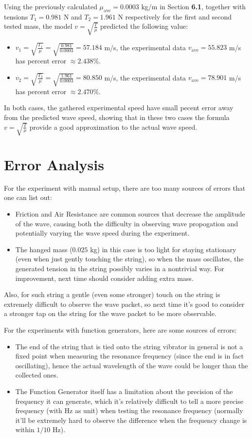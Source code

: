 \documentclass{article}
\begin{document}
\hfil

Using the previously calculated $\mu_\text{ave}= 0.0003$ kg/m in Section \textbf{6.1}, together with tensions $T_1 = 0.981$ N and $T_2 = 1.961$ N respectively for the first and second tested mass, the model $v = \sqrt{\frac{T}{\mu}}$ predicted the following value:
\begin{itemize}
    \item[1.] $v_1 =\sqrt{\frac{T_1}{\mu}}= \sqrt{\frac{0.981}{0.0003}} =  57.184$ m/s, the experimental data $v_\text{ave}=55.823$ m/s has percent error $\approx 2.438\%$.
    \item[2.] $v_2 = \sqrt{\frac{T_2}{\mu}}= \sqrt{\frac{1.961}{0.0003}} = 80.850$ m/s, the experimental data $v_\text{ave}=78.901$ m/s has percent error $\approx2.470\%$.
\end{itemize}
In both cases, the gathered experimental speed have small pecent error away from the predicted wave speed, showing that in these two cases the formula $v=\sqrt{\frac{T}{\mu}}$ provide a good approximation to the actual wave speed.

\hfil

\section{Error Analysis}
For the experiment with manual setup, there are too many sources of errors that one can list out:
\begin{itemize}
    \item Friction and Air Resistance are common sources that decrease the amplitude of the wave, causing both the difficulty in observing wave propogation and potentially varying the wave speed during the experiment.
    \item The hanged mass ($0.025$ kg) in this case is too light for staying stationary (even when just gently touching the string), so when the mass oscillates, the generated tension in the string possibly varies in a nontrivial way. For improvement, next time should consider adding extra mass.
\end{itemize}
Also, for such string a gentle (even some stronger) touch on the string is extremely difficult to observe the wave packet, so next time it's good to consider a stronger tap on the string for the wave packet to be more observable.

\hfil

For the experiments with function generators, here are some sources of errors:
\begin{itemize}
    \item The end of the string that is tied onto the string vibrator in general is not a fixed point when measuring the resonance frequency (since the end is in fact oscillating), hence the actual wavelength of the wave could be longer than the collected ones.
    \item The Function Generator itself has a limitation about the precision of the frequency it can generate, which it's relatively difficult to tell a more precise frequency (with Hz as unit) when testing the resonance frequency (normally it'll be extremely hard to observe the difference when the frequency change is within $1/10$ Hz).
\end{itemize}
\end{document}
